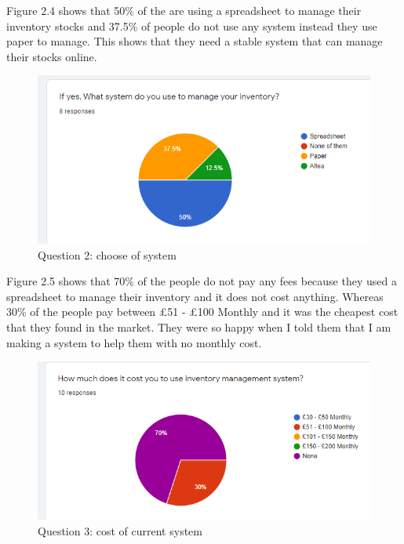 Figure 2.4 shows that 50\% of the are using a spreadsheet to manage their inventory stocks and 37.5\% of people do not use any system instead they use paper to manage. This shows that they need a stable system that can manage their stocks online.
\begin{figure}[h]
\centering
    \includegraphics[scale=0.7]
    {images/SurveyQue2.png}
    \caption{Question 2: choose of system}
    \label{fig: Question 2: Use any system}
\end{figure}

\newpage 
Figure 2.5 shows that 70\% of the people do not pay any fees because they used a spreadsheet to manage their inventory and it does not cost anything. Whereas 30\% of the people pay between £51 - £100 Monthly and it was the cheapest cost that they found in the market. They were so happy when I told them that I am making a system to help them with no monthly cost.
\begin{figure}[h]
\centering
    \includegraphics[scale=0.6]
    {images/SurveyQue3.png}
    \caption{Question 3: cost of current system}
    \label{fig: Question 3: cost of current system}
\end{figure}

